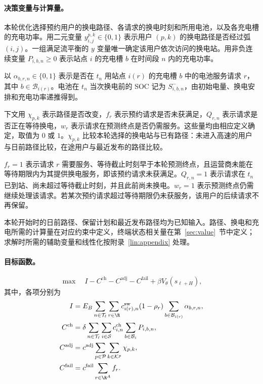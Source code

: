 \paragraph{决策变量与计算量。}
本轮优化选择预约用户的换电路径、各请求的换电时刻和所用电池，以及各充电槽的充电功率。用二元变量 $y_{i,j}^{p,k}\in\{0,1\}$ 表示用户 $(p,k)$ 的换电路径是否经过弧 $(i,j)$。一组满足流平衡的 $y$ 变量唯一确定该用户依次访问的换电站。用非负连续变量 $P_{i,b,n}\ge0$ 表示站点 $i$ 的充电槽 $b$ 在时间段 $n$ 内的充电功率。

以 $\alpha_{b,r,n}\in\{0,1\}$ 表示是否在 $t_n$ 用站点 $i(r)$ 的充电槽 $b$ 中的电池服务请求 $r$，其中 $b\in\mathcal B_{i(r)}$。电池在 $t_n$ 当次换电前的 SOC 记为 $S_{i,b,n}^{-}$，由初始电量、换电安排和充电功率递推得到。

下文用 $\chi_{p,k}$ 表示路径是否改变，$f_r$ 表示预约请求是否未获满足，$Q_{r,n}$ 表示请求是否正在等待换电，$w_r$ 表示请求在预测终点是否仍需服务。这些量均由相应定义确定，取值为 $0$ 或 $1$。$\chi_{p,k}$ 比较本轮选择的换电站与已有路径：未进入高速的用户与日前路径比较，在途用户与最近发布的路径比较。

$f_r=1$ 表示请求 $r$ 需要服务、等待截止时刻早于本轮预测终点，且运营商未能在等待期限内为其提供换电服务，即该预约请求未获满足。$Q_{r,n}=1$ 表示请求在 $t_n$ 已到站、尚未超过等待截止时刻，并且此前尚未换电。$w_r=1$ 表示预测终点仍需继续处理该请求。若某次预约请求超过等待期限仍未获服务，该用户的后续请求不再保留。

本轮开始时的日前路径、保留计划和最近发布路径均为已知输入。路径、换电和充电所需的计算量在对应约束中定义，终端状态相关量在第~\ref{sec:value}~节中定义；求解时所需的辅助变量和线性化按附录~\ref{lin:appendix} 处理。

\paragraph{目标函数。}

\begin{equation}
\max\quad I-C^{\mathrm{ch}}-C^{\mathrm{adj}}-C^{\mathrm{fail}}
+\beta V_\theta(s_{\ell+H}),
\label{eq:objective}
\end{equation}
其中，各项分别为
\[
\begin{aligned}
I&=E_B\sum_{n\in\mathcal T_\ell}\sum_{r\in\R}
c_{i(r),n}^{\mathrm{sw}}(1-\rho_r)\sum_{b\in\mathcal B_{i(r)}}\alpha_{b,r,n},\\
C^{\mathrm{ch}}&=\delta\sum_{n\in\mathcal T_\ell}\sum_{i\in\mathcal S}
c_{i,n}^{\mathrm{ch}}\sum_{b\in\mathcal B_i}P_{i,b,n},\\
C^{\mathrm{adj}}&=c^{\mathrm{adj}}\sum_{p\in\mathcal P}\sum_{k\in\mathcal K^p}\chi_{p,k},\\
C^{\mathrm{fail}}&=c^{\mathrm{fail}}\sum_{r\in\R^A}f_r.
\end{aligned}
\]

